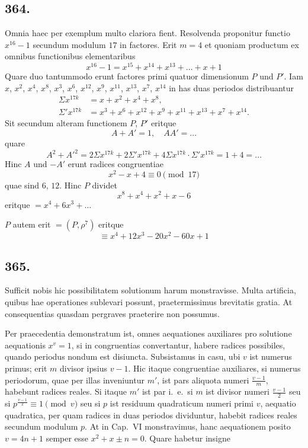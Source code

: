 \documentclass[12pt,a4paper]{article}
\begin{document}
\subsection*{364.}

Omnia haec per exemplum multo clariora fient. Resolvenda proponitur functio $x^{16}-1$ secundum modulum $17$ in factores. Erit $m=4$ et quoniam productum ex omnibus functionibus elementaribus
\[
x^{16}-1 = x^{15}+x^{14}+x^{13}+\ldots+x+1
\]
Quare duo tantummodo erunt factores primi quatuor dimensionum $P$ und $P'$. Iam $x$, $x^2$, $x^4$, $x^8$, $x^3$, $x^6$, $x^{12}$, $x^9$, $x^{11}$, $x^{13}$, $x^7$, $x^{14}$ in has duas periodos distribuantur
\[
\begin{aligned}
\Sigma x^{17k} &= x+x^2+x^4+x^8,\\
\Sigma' x^{17k} &= x^3+x^6+x^{12}+x^9+x^{11}+x^{13}+x^7+x^{14}.
\end{aligned}
\]
Sit secundum alteram functionem $P$, $P'$ eritque
\[
A+A'=1,\quad AA'=\ldots
\]
quare
\[
A^2+A'^2 = 2\Sigma x^{17k} + 2\Sigma' x^{17k} + 4\Sigma x^{17k}\cdot\Sigma' x^{17k} = 1+4=\ldots
\]
Hinc $A$ und $-A'$ erunt radices congruentiae
\[
x^2 - x + 4 \equiv 0 \pmod{17}
\]
quae sind $6$, $12$. Hinc $P$ dividet
\[
x^8+x^4+x^2+x-6
\]
eritque $=x^4+6x^3+\ldots$

$P$ autem erit $=(P,\rho^7)$ eritque
\[
\equiv x^4+12x^3-20x^2-60x+1
\]

\subsection*{365.}

Sufficit nobis hic possibilitatem solutionum harum monstravisse. Multa artificia, quibus hae operationes sublevari possunt, praetermissimus brevitatis gratia. At consequentias quasdam pergraves praeterire non possumus.

Per praecedentia demonstratum ist, omnes aequationes auxiliares pro solutione aequationis $x^v=1$, si in congruentias convertantur, habere radices possibiles, quando periodus nondum est disiuncta. Subsistamus in casu, ubi $v$ ist numerus primus; erit $m$ divisor ipsius $v-1$. Hic itaque congruentiae auxiliares, si numerus periodorum, quae per illas inveniuntur $m'$, ist pars aliquota numeri $\frac{v-1}{m}$, habebunt radices reales. Si itaque $m'$ ist par i.~e.~si $m$ ist divisor numeri $\frac{v-1}{2}$ seu si $p^{\frac{v-1}{2}}\equiv 1\pmod{v}$ seu si $p$ ist residuum quadraticum numeri primi $v$, aequatio quadratica, per quam radices in duas periodos dividuntur, habebit radices reales secundum modulum $p$. At in Cap.~VI monstravimus, hanc aequationem posito $v=4n+1$ semper esse $x^2+x\pm n=0$. Quare habetur insigne
\end{document}

